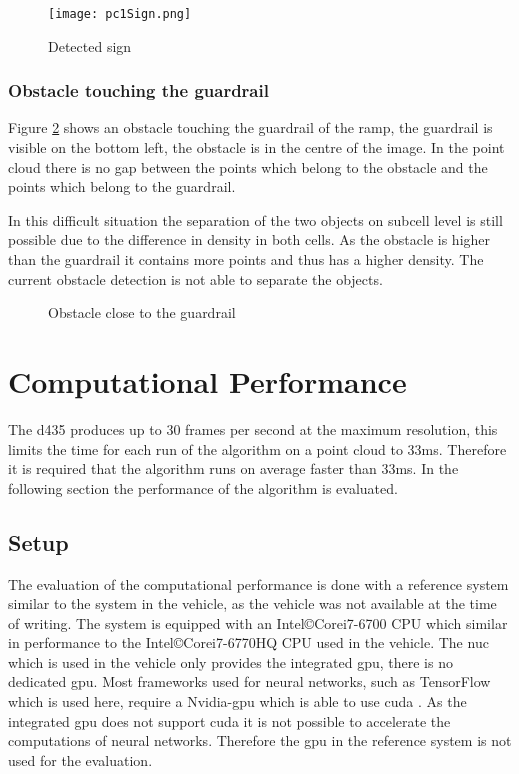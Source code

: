 \begin{figure}[h!]
    \centering
    \texttt{[image: pc1Sign.png]}
    \caption{Detected sign}
    \label{fig:eval:pc1Sign}
\end{figure}

\subsubsection{Obstacle touching the guardrail}
Figure \ref{fig:eval:pc0NotMerged} shows an obstacle touching the guardrail of the ramp, the guardrail is visible on the bottom left, the obstacle is in the centre of the image. 
In the point cloud there is no gap between the points which belong to the obstacle and the points which belong to the guardrail. 

In this difficult situation the separation of the two objects on subcell level is still possible due to the difference in density in both cells. As the obstacle is higher than the guardrail it contains more points and thus has a higher density. The current obstacle detection is not able to separate the objects.
\begin{figure}[h!]
    \centering
    \caption{Obstacle close to the guardrail}
    \label{fig:eval:pc0NotMerged}
\end{figure}

\section{Computational Performance}
The \ac{d435} produces up to 30 frames per second at the maximum resolution, this limits the time for each run of the algorithm on a point cloud to 33ms.
Therefore it is required that the algorithm runs on average faster than 33ms.
In the following section the performance of the algorithm is evaluated.

\subsection{Setup}
The evaluation of the computational performance is done with a reference system similar to the system in the vehicle, as the vehicle was not available at the time of writing.
The system is equipped with an Intel\copyright Core\texttrademark i7-6700 CPU which similar in performance to the Intel\copyright Core\texttrademark i7-6770HQ CPU used in the vehicle.
The \ac{nuc} which is used in the vehicle only provides the integrated \ac{gpu}, there is no dedicated \ac{gpu}. 
Most frameworks used for neural networks, such as TensorFlow which is used here, require a Nvidia-\ac{gpu} which is able to use \ac{cuda} \cite{tensorflow2019}. As the integrated \ac{gpu} does not support \ac{cuda} it is not possible to accelerate the computations of neural networks. Therefore the \ac{gpu} in the reference system is not used for the evaluation.

